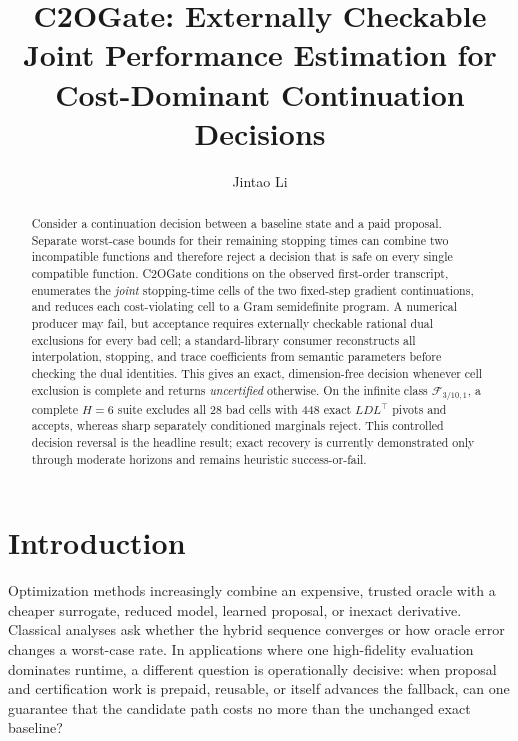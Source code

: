 \documentclass[smallextended]{svjour3}
\title{C2OGate: Externally Checkable Joint Performance Estimation for
Cost-Dominant Continuation Decisions}
\author{Jintao Li}
\institute{Jintao Li \at
NUS (Chongqing) Research Institute, Chongqing, China \\
\email{e0622340@u.nus.edu}}
\date{}
\newcommand{\cF}{\mathcal{F}}
\begin{document}
\raggedbottom
\maketitle

\begin{abstract}
Consider a continuation decision between a baseline state and a paid proposal.
Separate worst-case bounds for their remaining stopping times can combine two
incompatible functions and therefore reject a decision that is safe on every
single compatible function.  C2OGate conditions on the observed first-order
transcript, enumerates the \emph{joint} stopping-time cells of the two
fixed-step gradient continuations, and reduces each cost-violating cell to a
Gram semidefinite program.  A numerical producer may fail, but acceptance
requires externally checkable rational dual exclusions for every bad cell; a
standard-library consumer reconstructs all interpolation, stopping, and trace
coefficients from semantic parameters before checking the dual identities.
This gives an exact, dimension-free decision whenever cell exclusion is
complete and returns \emph{uncertified} otherwise.  On the infinite class
$\cF_{3/10,1}$, a complete $H=6$ suite excludes all 28 bad cells with 448 exact
$LDL^\top$ pivots and accepts, whereas sharp separately conditioned marginals
reject.  This controlled decision reversal is the headline result; exact
recovery is currently demonstrated only through moderate horizons and remains
heuristic success-or-fail.
\end{abstract}

\section{Introduction}

Optimization methods increasingly combine an expensive, trusted oracle with a
cheaper surrogate, reduced model, learned proposal, or inexact derivative.
Classical analyses ask whether the hybrid sequence converges or how oracle
error changes a worst-case rate.  In applications where one high-fidelity
evaluation dominates runtime, a different question is operationally decisive:
when proposal and certification work is prepaid, reusable, or itself advances
the fallback, can one guarantee that the candidate path costs no more than the
unchanged exact baseline?
\end{document}
